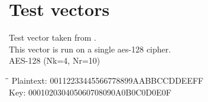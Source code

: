 \chapter{Test vectors}

\arraycolsep=0.5pt

Test vector taken from \citet[pp. 35--36]{AES:2001}. \\
This vector is run on a single aes-128 cipher. \\
AES-128 (Nk=4, Nr=10) \\
\begin{tabbing}
  \hspace*{3cm}\=\hspace*{3cm}\= \kill
  Plaintext: \> 00112233445566778899AABBCCDDEEFF \\
  Key: \> 000102030405060708090A0B0C0D0E0F \\
\end{tabbing}

